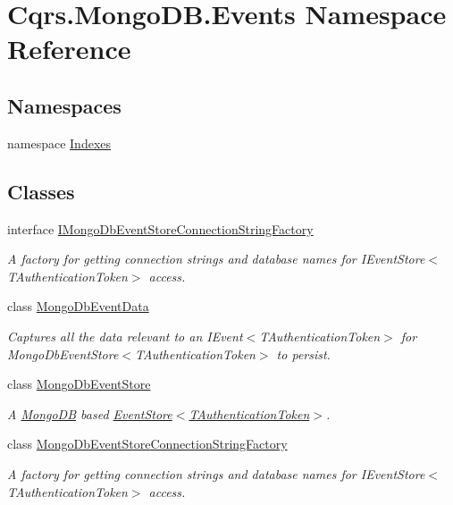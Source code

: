 \hypertarget{namespaceCqrs_1_1MongoDB_1_1Events}{}\section{Cqrs.\+Mongo\+D\+B.\+Events Namespace Reference}
\label{namespaceCqrs_1_1MongoDB_1_1Events}
\subsection*{Namespaces}
\begin{DoxyCompactItemize}
\item 
namespace \hyperlink{namespaceCqrs_1_1MongoDB_1_1Events_1_1Indexes}{Indexes}
\end{DoxyCompactItemize}
\subsection*{Classes}
\begin{DoxyCompactItemize}
\item 
interface \hyperlink{interfaceCqrs_1_1MongoDB_1_1Events_1_1IMongoDbEventStoreConnectionStringFactory}{I\+Mongo\+Db\+Event\+Store\+Connection\+String\+Factory}
\begin{DoxyCompactList}\small\item\em A factory for getting connection strings and database names for I\+Event\+Store$<$\+T\+Authentication\+Token$>$ access. \end{DoxyCompactList}\item 
class \hyperlink{classCqrs_1_1MongoDB_1_1Events_1_1MongoDbEventData}{Mongo\+Db\+Event\+Data}
\begin{DoxyCompactList}\small\item\em Captures all the data relevant to an I\+Event$<$\+T\+Authentication\+Token$>$ for Mongo\+Db\+Event\+Store$<$\+T\+Authentication\+Token$>$ to persist. \end{DoxyCompactList}\item 
class \hyperlink{classCqrs_1_1MongoDB_1_1Events_1_1MongoDbEventStore}{Mongo\+Db\+Event\+Store}
\begin{DoxyCompactList}\small\item\em A \hyperlink{namespaceCqrs_1_1MongoDB}{Mongo\+DB} based \hyperlink{classCqrs_1_1Events_1_1EventStore_a6346cb2aea4c5b4e740dc6cfb15abab8_a6346cb2aea4c5b4e740dc6cfb15abab8}{Event\+Store$<$\+T\+Authentication\+Token$>$}. \end{DoxyCompactList}\item 
class \hyperlink{classCqrs_1_1MongoDB_1_1Events_1_1MongoDbEventStoreConnectionStringFactory}{Mongo\+Db\+Event\+Store\+Connection\+String\+Factory}
\begin{DoxyCompactList}\small\item\em A factory for getting connection strings and database names for I\+Event\+Store$<$\+T\+Authentication\+Token$>$ access. \end{DoxyCompactList}\end{DoxyCompactItemize}
